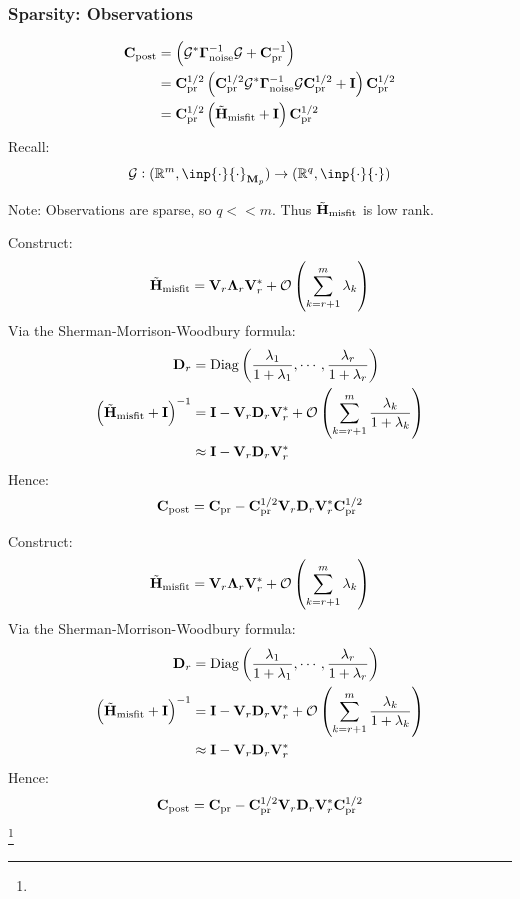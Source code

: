 \documentclass[
  pdf,
  10pt,
  xcolor={svgnames},
]{beamer}
\newcommand\blfootnote[1]{%
  \begingroup
  \renewcommand\thefootnote{}\footnote{#1}%
  \addtocounter{footnote}{-1}%
  \endgroup
}
\newcommand{\mc}[1]{\mathcal{#1}}
\newcommand{\R}{\mathbb{R}}
\newcommand{\mat}[1]{\mathbf{{#1}}}
\begin{document}
\begin{frame}
  \frametitle{Sparsity: Observations}
  \begin{align*}
    \mat{C}_{\rm post}
    &= 
    \left(
      \mc{G}^* \vb{\Gamma}_{\rm noise}^{-1} \mc{G} + \mat{C}_{\rm pr}^{-1}
    \right) \\
    &=
    \mat{C}_{\rm pr}^{1/2}
    \left(
      \mat{C}_{\rm pr}^{1/2}
      \mc{G}^* \vb{\Gamma}_{\rm noise}^{-1} \mc{G} 
      \mat{C}_{\rm pr}^{1/2}
      + \mat{I}
    \right) 
    \mat{C}_{\rm pr}^{1/2} \\
    &=
    \mat{C}_{\rm pr}^{1/2}
    \left(
      \tilde{\mat{H}}_{\rm misfit} + \mat{I}
    \right) 
    \mat{C}_{\rm pr}^{1/2}
  \end{align*}
  \pause
  Recall:
  \[
    \mc{G}:
    (\R^m, \inp{\cdot}{\cdot}_{\mat{M}_p}) \to (\R^q, \inp{\cdot}{\cdot})
  \]
  \begin{block}{Note:}
    Observations are sparse, so $q << m$. Thus $\tilde{\mat{H}}_{\rm misfit}$ is
    low rank.
  \end{block}
\end{frame}

\begin{frame}
  Construct:
  \[
    \tilde{\mat{H}}_{\rm misfit}
    = \mat{V}_r \mat{\Lambda}_r \mat{V}_r^*
    + \mc{O}\left( \sum_{k=r+1}^m \lambda_k \right)
  \]
  \pause
  Via the Sherman-Morrison-Woodbury formula:
  \begin{align*}
    \mat{D}_r
    &=
    {\rm Diag}\left(
      \frac{\lambda_1}{1+\lambda_1}, \cdots, \frac{\lambda_r}{1+\lambda_r}
    \right) \\
    \left(
      \tilde{\mat{H}}_{\rm misfit} + \mat{I}
    \right)^{-1}
    &= 
    \mat{I} - \mat{V}_r \mat{D}_r \mat{V}_r^*
    + \mc{O}\left( \sum_{k=r+1}^m \frac{\lambda_k}{1+\lambda_k} \right) \\
    &\approx
    \mat{I} - \mat{V}_r \mat{D}_r \mat{V}_r^*
  \end{align*}
  \pause
  Hence:
  \[
    \mat{C}_{\rm post}
    = 
    \mat{C}_{\rm pr} 
    - \mat{C}_{\rm pr}^{1/2} \mat{V}_r \mat{D}_r \mat{V}_r^* \mat{C}_{\rm pr}^{1/2}
  \]
\end{frame}
\begin{frame}
  Construct:
  \[
    \tilde{\mat{H}}_{\rm misfit}
    = \mat{V}_r \mat{\Lambda}_r \mat{V}_r^*
    + \mc{O}\left( \sum_{k=r+1}^m \lambda_k \right)
  \]
  Via the Sherman-Morrison-Woodbury formula:
  \begin{align*}
    \mat{D}_r
    &=
    {\rm Diag}\left(
      \frac{\lambda_1}{1+\lambda_1}, \cdots, \frac{\lambda_r}{1+\lambda_r}
    \right) \\
    \left(
      \tilde{\mat{H}}_{\rm misfit} + \mat{I}
    \right)^{-1}
    &= 
    \mat{I} - \mat{V}_r \mat{D}_r \mat{V}_r^*
    + \mc{O}\left( \sum_{k=r+1}^m \frac{\lambda_k}{1+\lambda_k} \right) \\
    &\approx
    \mat{I} - \mat{V}_r \mat{D}_r \mat{V}_r^*
  \end{align*}
  Hence:
  \[
    \mat{C}_{\rm post}
    = 
    \mat{C}_{\rm pr} 
    - \mat{C}_{\rm pr}^{1/2} \mat{V}_r \mat{D}_r \mat{V}_r^* \mat{C}_{\rm pr}^{1/2}
  \]
  \blfootnote{}
\end{frame}
\end{document}
